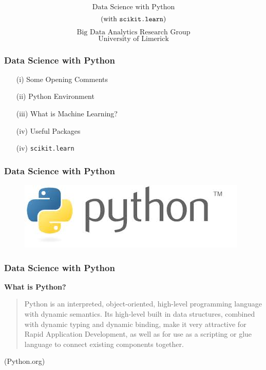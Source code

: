 \documentclass{beamer}
\begin{document}
\begin{frame}
	\huge
	
	\[\mbox{Data Science with Python} \]
	{\Large
	\[\mbox{(with \texttt{scikit.learn}})\]
}
	\bigskip
	\[ \mbox{Big Data Analytics Research Group} \]
	\[ \mbox{University of Limerick} \]
\end{frame}
\begin{frame}[fragile]
	\frametitle{Data Science with Python}
	\LARGE
	\begin{itemize}
		\item[(i)] Some Opening Comments
		\item[(ii)] Python Environment
		\item[(iii)] What is Machine Learning?
		\item[(iv)] Useful Packages
		\item[(iv)] \texttt{scikit.learn}
	\end{itemize}
	
\end{frame}

\begin{frame}
		\frametitle{Data Science with Python}
	\begin{figure}
		\centering
		\includegraphics[width=1.1\linewidth]{pythonlogo}
		
	\end{figure}
	
\end{frame}
\begin{frame}
		\frametitle{Data Science with Python}
	\Large
	\textbf{What is Python?}
	\begin{quote}
		Python is an interpreted, object-oriented, high-level programming language with dynamic semantics. Its high-level built in data structures, combined with dynamic typing and dynamic binding, make it very attractive for Rapid Application Development, as well as for use as a scripting or glue language to connect existing components together. 
	\end{quote}
	
	(Python.org)
\end{frame}
\end{document}

